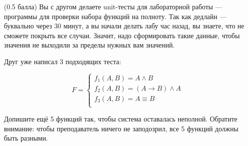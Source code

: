 \question
(0.5 балла) Вы с другом делаете unit-тесты для лабораторной работы — программы для проверки набора функций на полноту. Так как дедлайн — буквально через 30 минут, а вы начали делать лабу час назад, вы знаете, что не сможете покрыть все случаи. Значит, надо сформировать такие данные, чтобы значения не выходили за пределы нужных вам значений.

Друг уже написал 3 подходящих теста:

\begin{equation*}
    F=
    \begin{cases}
        f_1(A,B)=A \land B\\
        f_2(A,B)=(A \rightarrow B) \land A\\
        f_3(A,B)=A \equiv B\\
    \end{cases}
\end{equation*}
    
Допишите ещё 5 функций так, чтобы система оставалась неполной. Обратите внимание: чтобы преподаватель ничего не заподозрил, все 5 функций должны быть разными.